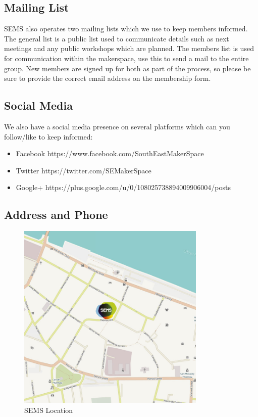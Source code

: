 \documentclass{article}
\begin{document}
\subsection*{Mailing List}
SEMS also operates two mailing lists which we use to keep members informed. The general list is a public list used to communicate details such as next meetings and any public workshops which are planned. The members list is used for communication within the makerspace, use this to send a mail to the entire group. New members are signed up for both as part of the process, so please be sure to provide the correct email address on the membership form.


\subsection*{Social Media}
We also have a social media presence on several platforms which can you
follow/like to keep informed:

\begin{itemize}
\item Facebook https://www.facebook.com/SouthEastMakerSpace
\item Twitter https://twitter.com/SEMakerSpace
\item Google+ https://plus.google.com/u/0/108025738894009906004/posts
\end{itemize}


\subsection*{Address and Phone}

%
\begin{figure}[ht]
	\centering
	\includegraphics[width=9cm]{sems_local_map_750_750}
	\caption{SEMS Location}
	\label{fig:sems_location}
\end{figure}
%
\end{document}
